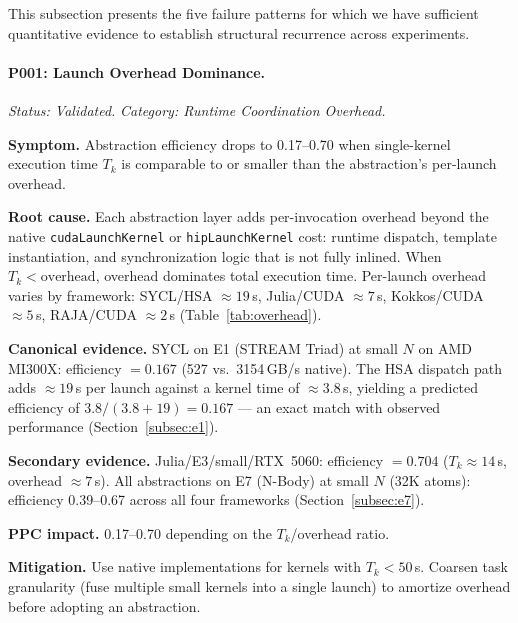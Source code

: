 This subsection presents the five failure patterns for which we have
sufficient quantitative evidence to establish structural recurrence
across experiments.

\paragraph{P001: Launch Overhead Dominance.}
\textit{Status: Validated.}
\textit{Category: Runtime Coordination Overhead.}

\noindent\textbf{Symptom.}
Abstraction efficiency drops to 0.17--0.70 when single-kernel execution time
$T_k$ is comparable to or smaller than the abstraction's per-launch overhead.

\noindent\textbf{Root cause.}
Each abstraction layer adds per-invocation overhead beyond the native
\texttt{cudaLaunchKernel} or \texttt{hipLaunchKernel} cost: runtime dispatch,
template instantiation, and synchronization logic that is not fully inlined.
When $T_k < \text{overhead}$, overhead dominates total execution time.
Per-launch overhead varies by framework: SYCL/HSA $\approx 19$\,\textmu{}s,
Julia/CUDA $\approx 7$\,\textmu{}s, Kokkos/CUDA $\approx 5$\,\textmu{}s,
RAJA/CUDA $\approx 2$\,\textmu{}s (Table~\ref{tab:overhead}).

\noindent\textbf{Canonical evidence.}
SYCL on E1 (STREAM Triad) at small $N$ on AMD MI300X: efficiency $= 0.167$
(527 vs.\ 3154\,GB/s native). The HSA dispatch path adds $\approx 19$\,\textmu{}s
per launch against a kernel time of $\approx 3.8$\,\textmu{}s, yielding a
predicted efficiency of $3.8 / (3.8 + 19) = 0.167$ --- an exact match with
observed performance (Section~\ref{subsec:e1}).

\noindent\textbf{Secondary evidence.}
Julia/E3/small/RTX~5060: efficiency $= 0.704$ ($T_k \approx 14$\,\textmu{}s,
overhead $\approx 7$\,\textmu{}s). All abstractions on E7 (N-Body) at small
$N$ (32K atoms): efficiency 0.39--0.67 across all four frameworks
(Section~\ref{subsec:e7}).

\noindent\textbf{PPC impact.} 0.17--0.70 depending on the $T_k$/overhead ratio.

\noindent\textbf{Mitigation.}
Use native implementations for kernels with $T_k < 50$\,\textmu{}s. Coarsen
task granularity (fuse multiple small kernels into a single launch) to
amortize overhead before adopting an abstraction.

